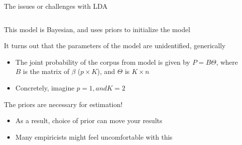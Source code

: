 \documentclass[notes,11pt, aspectratio=169]{beamer}
\newenvironment{wideitemize}{\itemize\addtolength{\itemsep}{10pt}}{\enditemize}
\begin{document}
  \begin{frame}{The issues or challenges with LDA}
    \begin{columns}[onlytextwidth, T] %
      \begin{column}{.5\textwidth}
    \begin{wideitemize}
    \item This model is Bayesian, and uses priors to initialize the model
    \item It turns out that the parameters of the model are
      unidentified, generically
      \begin{itemize}
      \item The joint probability of the corpus from model is given by
        $P = B\Theta$, where $B$ is the matrix of $\beta$
        ($p \times K$), and $\Theta$ is $K \times n$
      \item Concretely, imagine $p = 1, and K = 2$
      \end{itemize}
    \item The priors are necessary for estimation!
      \begin{itemize}
      \item As a result, choice of prior can move your results
      \item Many empiricists might feel uncomfortable with this        
      \end{itemize}
    \end{wideitemize}
      \end{column}%
      \hfill%
      \begin{column}{.5\textwidth}
      \end{column}%
    \end{columns}
  \end{frame}
\end{document}
